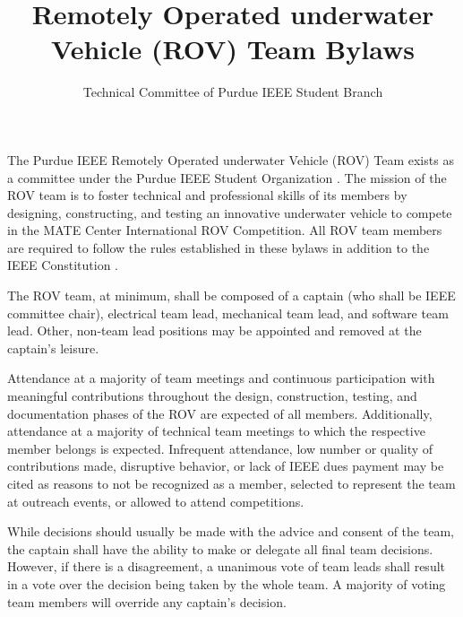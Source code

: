 \documentclass[12pt]{constitution}
\title{Remotely Operated underwater Vehicle (ROV) Team Bylaws}
\author{Technical Committee of Purdue IEEE Student Branch}
\date{}
\begin{document}

\titlecontentspage
\newpage


\label{art:preamble}

The Purdue IEEE Remotely Operated underwater Vehicle (ROV) Team exists as a committee under the Purdue IEEE Student Organization . The mission of the ROV team is to foster technical and professional skills of its members by designing, constructing, and testing an innovative underwater vehicle to compete in the MATE Center International ROV Competition. All ROV team members are required to follow the rules established in these bylaws in addition to the IEEE Constitution .


\label{art:structmem}

The ROV team, at minimum, shall be composed of a captain (who shall be IEEE  committee chair), electrical team lead, mechanical team lead, and software team lead. Other, non-team lead positions may be appointed and removed at the captain's leisure.

Attendance at a majority of team meetings and continuous participation with meaningful contributions throughout the design, construction, testing, and documentation phases of the ROV are expected of all members. Additionally, attendance at a majority of technical team meetings to which the respective member belongs is expected. Infrequent attendance, low number or quality of contributions made, disruptive behavior, or lack of IEEE dues payment may be cited as reasons to not be recognized as a member, selected to represent the team at outreach events, or allowed to attend competitions.


\label{art:decide}

While decisions should usually be made with the advice and consent of the team, the captain shall have the ability to make or delegate all final team decisions. However, if there is a disagreement, a unanimous vote of team leads shall result in a vote over the decision being taken by the whole team. A majority of voting team members will override any captain's decision.
\end{document}
